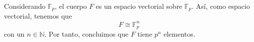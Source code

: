 \documentclass[a4paper, 11pt]{article}
\begin{document}
  \maketitle

  \begin{ejercicio}
  \end{ejercicio}

  \begin{solucion}
      Considerando $\mathbb{F}_p$, el cuerpo $F$ es un espacio vectorial sobre $\mathbb{F}_p$. Así, como espacio vectorial, tenemos que
      \[
      F \cong \mathbb{F}_p^n
      \]
      con un $n\in\mathbb{N}$. Por tanto, concluimos que $F$ tiene $p^n$ elementos.
  \end{solucion}

  \begin{ejercicio}
  \end{ejercicio}
\end{document}
